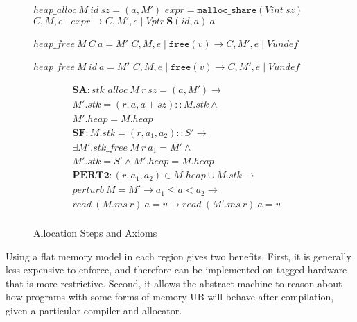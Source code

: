 \documentclass{article}
\begin{document}
\begin{figure}
\begin{minipage}[t]{0.65\textwidth}
                    {\(\mathit{heap\_alloc} ~ M ~ id ~ sz = (a, M')\)}
                    {\(\mathit{expr} = \mathtt{malloc\_share}(\mathit{Vint} ~ sz)\)}
                    {\(C,M,e \mid \mathit{expr} \longrightarrow
                      C,M',e \mid \mathit{Vptr} ~ \mathbf{S}(id,a) ~ a\)}

              {\(\mathit{heap\_free} ~ M ~ C ~ a = M'\)}
              {\(C,M,e \mid \mathtt{free}(v) \longrightarrow
                C,M',e \mid \mathit{Vundef}\)}

             {\(\mathit{heap\_free} ~ M ~ id ~ a = M'\)}
             {\(C,M,e \mid \mathtt{free}(v)  \longrightarrow
               C,M',e \mid \mathit{Vundef}\)}

  \[\begin{split}
    \mathbf{SA} : \mathit{stk\_alloc} ~ M ~ r ~ sz = (a, M') \rightarrow & \\
    M'.stk = (r,a,a+sz)::M.stk \land & \\
    M'.heap = M.heap & \\[0.75em]
    \mathbf{SF} : M.stk = (r,a_1,a_2)::S' \rightarrow & \\
    \exists M' . \mathit{stk\_free} ~ M ~ r ~ a_1 = M' \land & \\
    M'.stk = S' \land M'.heap = M.heap & \\[0.75em]
    \mathbf{PERT2} : (r,a_1,a_2) \in M.heap \cup M.stk \rightarrow & \\
    \mathit{perturb} ~ M = M' \rightarrow
    a_1 \leq a < a_2 \rightarrow & \\
    \mathit{read} ~ (M.ms ~ r) ~ a = v \rightarrow 
    \mathit{read} ~ (M'.ms ~ r) ~ a = v & \\[0.75em]
  \end{split}\]
  \end{minipage}

  \caption{Allocation Steps and Axioms}
  \label{subfig:alstep}
\end{figure}


Using a flat memory model in each region gives two benefits. First, it is generally
less expensive to enforce, and therefore can be implemented on tagged hardware that is more
restrictive. Second, it allows the abstract machine to reason about how programs with some
forms of memory UB will behave after compilation, given a particular compiler and allocator.
\end{document}

